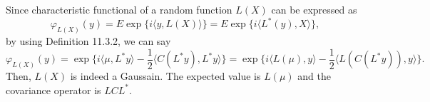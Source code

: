 \documentclass{article}
\theoremstyle{definition}
\numberwithin{equation}{section}
\begin{document}
\begin{mysol}
Since characteristic functional of a random function $L(X)$ can be expressed as
$$
\varphi_{L(X)}(y) 
= E \exp \{ i \langle y,L(X) \rangle \}
= E \exp \{ i \langle L^{*}(y),X \rangle \},
$$
by using Definition 11.3.2, we can say
$$
\varphi_{L(X)}(y) 
= \exp \big\{ i \langle \mu, L^{*}y \rangle - \frac{1}{2} \langle C(L^{*}y), L^{*}y \rangle \big\}
= \exp \big\{ i \langle L(\mu), y \rangle - \frac{1}{2} \langle L(C(L^{*}y)), y \rangle \big\}.
$$
Then, $L(X)$ is indeed a Gaussain. The expected value is $L(\mu)$ and the covariance operator is $LCL^{*}$.
\end{mysol}


\end{document}
